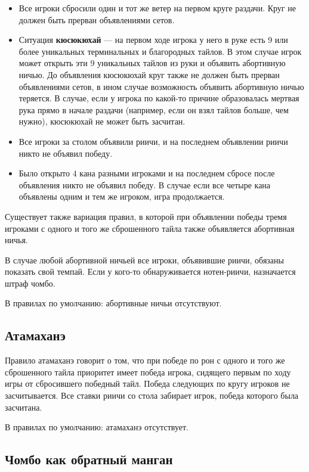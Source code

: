 \begin{itemize}
	\item Все игроки сбросили один и тот же ветер на первом круге раздачи. Круг не должен быть прерван объявлениями сетов.
	\item Ситуация \textbf{кюсюкюхай} --- на первом ходе игрока у него в руке есть 9 или более уникальных терминальных и благородных тайлов. В этом случае игрок может открыть эти 9 уникальных тайлов из руки и объявить абортивную ничью. До объявления кюсюкюхай круг также не должен быть прерван объявлениями сетов, в ином случае возможность объявить абортивную ничью теряется. В случае, если у игрока по какой-то причине образовалась мертвая рука прямо в начале раздачи (например, если он взял тайлов больше, чем нужно), кюсюкюхай не может быть засчитан.
	\item Все игроки за столом объявили риичи, и на последнем объявлении риичи никто не объявил победу.
	\item Было открыто 4 кана разными игроками и на последнем сбросе после объявления никто не объявил победу. В случае если все четыре кана объявлены одним и тем же игроком, игра продолжается.
\end{itemize}

Существует также вариация правил, в которой при объявлении победы тремя игроками с одного и того же сброшенного тайла также объявляется абортивная ничья.

В случае любой абортивной ничьей все игроки, объявившие риичи, обязаны показать свой темпай. Если у кого-то обнаруживается нотен-риичи, назначается штраф чомбо.

В правилах по умолчанию: абортивные ничьи отсутствуют.

\subsection{Атамаханэ}

Правило атамаханэ говорит о том, что при победе по рон с одного и того же сброшенного тайла приоритет имеет победа игрока, сидящего первым по ходу игры от сбросившего победный тайл. Победа следующих по кругу игроков не засчитывается. Все ставки риичи со стола забирает игрок, победа которого была засчитана.

В правилах по умолчанию: атамаханэ отсутствует.

\subsection{Чомбо как обратный манган}

